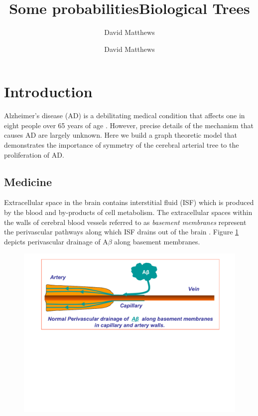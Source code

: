 \documentclass[12pt]{article} %
\title{Some probabilities}
\author{David Matthews}
\theoremstyle{definition}
\begin{document}
\title{Biological Trees}
\author{David Matthews}

\section{Introduction}
Alzheimer's disease (AD) is a debilitating medical condition that affects one in eight people over 65 years of age \cite{Bengt}.  However, precise details of the mechanism that causes AD are largely unknown.  Here we build a graph theoretic model that demonstrates the importance of symmetry of the cerebral arterial tree to the proliferation of AD.

\subsection{Medicine}

Extracellular space in the brain contains interstitial fluid (ISF) which is produced by the blood and by-products of cell metabolism.  The extracellular spaces within the walls of cerebral blood vessels referred to as \emph{basement membranes} represent the perivascular pathways along which ISF drains out of the brain \cite{wellerperi,wellermicro,Rox}.  Figure \ref{fig:1} depicts perivascular drainage of A$\beta$ along basement membranes. 

\begin{figure}[h]

              \centering
               \includegraphics[scale=0.3]{PVD1.pdf}
                \caption{}\label{fig:1}
\end{figure}
\end{document}
